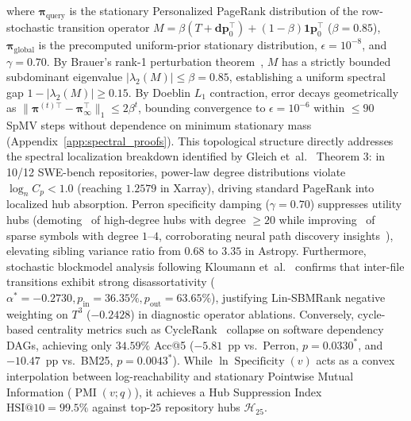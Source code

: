 \documentclass[10pt]{article}
\begin{document}
where $\boldsymbol{\pi}_{\text{query}}$ is the stationary Personalized PageRank distribution of the row-stochastic transition operator $M = \beta (T + \mathbf{d}\mathbf{p}_0^\top) + (1-\beta)\mathbf{1}\mathbf{p}_0^\top$ ($\beta=0.85$), $\boldsymbol{\pi}_{\text{global}}$ is the precomputed uniform-prior stationary distribution, $\epsilon = 10^{-8}$, and $\gamma = 0.70$. By Brauer's rank-1 perturbation theorem~\cite{haveliwala2003second}, $M$ has a strictly bounded subdominant eigenvalue $|\lambda_2(M)| \le \beta = 0.85$, establishing a uniform spectral gap $1 - |\lambda_2(M)| \ge 0.15$. By Doeblin $L_1$ contraction, error decays geometrically as $\|\boldsymbol{\pi}^{(t)\top} - \boldsymbol{\pi}_\infty^\top\|_1 \le 2\beta^t$, bounding convergence to $\epsilon=10^{-6}$ within $\le 90$ SpMV steps without dependence on minimum stationary mass (Appendix~\ref{app:spectral_proofs}). This topological structure directly addresses the spectral localization breakdown identified by Gleich et~al.~\cite{gleich2017localization} Theorem 3: in 10/12 SWE-bench repositories, power-law degree distributions violate $\log_n C_p < 1.0$ (reaching $1.2579$ in Xarray), driving standard PageRank into localized hub absorption. Perron specificity damping ($\gamma=0.70$) suppresses utility hubs (demoting \HonestDemotionDegGeTwentyDemotedPct\ of high-degree hubs with degree $\ge 20$ while improving \HonestDemotionDegOneFourImprovedPct\ of sparse symbols with degree $1\text{--}4$, corroborating neural path discovery insights~\cite{bojchevski2020scaling,rozemberczki2021pdn}), elevating sibling variance ratio from $0.68$ to $3.35$ in Astropy. Furthermore, stochastic blockmodel analysis following Kloumann et~al.~\cite{kloumann2017block} confirms that inter-file transitions exhibit strong disassortativity ($\alpha^* = -0.2730, p_{\text{in}}=36.35\%, p_{\text{out}}=63.65\%$), justifying Lin-SBMRank negative weighting on $T^3$ ($-0.2428$) in diagnostic operator ablations. Conversely, cycle-based centrality metrics such as CycleRank~\cite{cavalcanti2024comparing} collapse on software dependency DAGs, achieving only $34.59\%$ Acc@5 ($-5.81$~pp vs.\ Perron, $p=0.0330^*$, and $-10.47$~pp vs.\ BM25, $p=0.0043^*$). While $\ln \operatorname{Specificity}(v)$ acts as a convex interpolation between log-reachability and stationary Pointwise Mutual Information ($\operatorname{PMI}(v; q)$), it achieves a Hub Suppression Index $\text{HSI@10} = 99.5\%$ against top-25 repository hubs $\mathcal{H}_{25}$.
\end{document}
